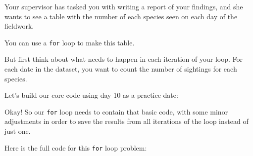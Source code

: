 \documentclass[
]{book}
\newenvironment{Shaded}{\begin{snugshade}}{\end{snugshade}}
\newcommand{\CommentTok}[1]{\textcolor[rgb]{0.56,0.35,0.01}{\textit{#1}}}
\newcommand{\DecValTok}[1]{\textcolor[rgb]{0.00,0.00,0.81}{#1}}
\newcommand{\KeywordTok}[1]{\textcolor[rgb]{0.13,0.29,0.53}{\textbf{#1}}}
\newcommand{\NormalTok}[1]{#1}
\newcommand{\OperatorTok}[1]{\textcolor[rgb]{0.81,0.36,0.00}{\textbf{#1}}}
\newcommand{\StringTok}[1]{\textcolor[rgb]{0.31,0.60,0.02}{#1}}
\begin{document}
Your supervisor has tasked you with writing a report of your findings, and she wants to see a table with the number of each species seen on each day of the fieldwork.

You can use a \texttt{for} loop to make this table.

But first think about what needs to happen in each iteration of your loop. For each date in the dataset, you want to count the number of sightings for each species.

Let's build our core code using day 10 as a practice date:

\begin{Shaded}
\end{Shaded}

Okay! So our \texttt{for} loop needs to contain that basic code, with some minor adjustments in order to save the results from all iterations of the loop instead of just one.

Here is the full code for this \texttt{for} loop problem:
\end{document}
